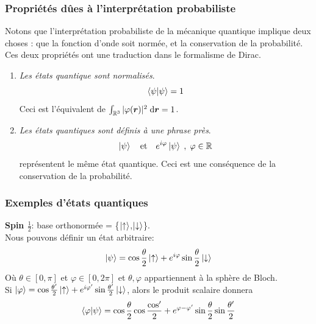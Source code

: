 \documentclass[../notesdecours.tex]{subfiles}
\begin{document}
\subsubsection{Propriétés dûes à l'interprétation probabiliste}
Notons que l'interprétation probabiliste de la mécanique quantique implique deux choses : que la fonction d'onde soit normée, et la conservation de la probabilité. Ces deux propriétés ont une traduction dans le formalisme de Dirac.

\begin{enumerate}
\item \emph{Les états quantique sont normalisés}.
\begin{equation}
\braket{\psi|\psi} = 1
\end{equation}
Ceci est l'équivalent de $\int_{\mathbb{R}^3} |\varphi(\bm{r})| ^2 \; \mathrm{d} \bm{r} = 1$.
\item \emph{Les états quantiques sont définis à une phrase près}.
\begin{equation}
\ket{\psi} 	\quad \text{et} \quad  e^{i\varphi}\ket{\psi} \; , \; \varphi \in \mathbb{R}
\end{equation}
représentent le même état quantique. Ceci est une conséquence de la conservation de la probabilité.
\end{enumerate}


\subsubsection{Exemples d'états quantiques}
\textbf{Spin $\frac{1}{2}$}: base orthonormée = \bigg\{$\ket{\uparrow}$,$\ket{\downarrow}$\bigg\}.\\

Nous pouvons définir un état arbitraire:
\begin{equation}
\ket{\psi} = \cos\frac{\theta}{2} \ket{\uparrow}+e^{i\varphi}\sin\frac{\theta}{2}\ket{\downarrow}
\end{equation}
Où $\theta\in[0,\pi]$ et $\varphi \in [0,2\pi]$ et $\theta,\varphi$ appartiennent à la sphère de Bloch.\\

Si $\ket{\varphi} = \cos\frac{\theta'}{2}\ket{\uparrow}+e^{i\varphi'}\sin\frac{\theta'}{2}\ket{\downarrow}$, alors le produit scalaire donnera
\begin{equation}
\braket{\varphi|\psi} = \cos\frac{\theta}{2}\cos\frac{\cos'}{2}+e^{\varphi-\varphi'}\sin\frac{\theta}{2}\sin\frac{\theta'}{2}
\end{equation}
\end{document}
